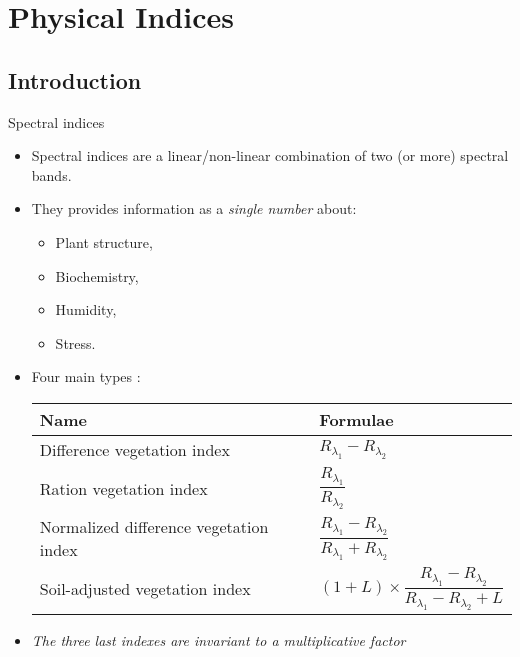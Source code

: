 \documentclass[10pt,aspectratio=1610]{beamer}
\begin{document}
\section{Physical Indices}
\label{sec:org38aefb3}
\subsection{Introduction}
\label{sec:orga617182}
\begin{frame}[label={sec:org0709c32}]{Spectral indices}
\begin{itemize}
\item Spectral indices are a linear/non-linear combination of two (or more) spectral bands.
\item They provides information as a \emph{single number} about:
\begin{itemize}
\item Plant structure,
\item Biochemistry,
\item Humidity,
\item Stress.
\end{itemize}
\item Four main types \cite{hrsv:2011}:
\begin{center}
\begin{tabular}{ll}
\toprule
Name & Formulae\\
\midrule
Difference vegetation index & \(R_{\lambda_1} - R_{\lambda_2}\)\\
Ration vegetation index & \(\dfrac{R_{\lambda_1}}{R_{\lambda_2}}\)\\
Normalized difference vegetation index & \(\dfrac{R_{\lambda_1} - R_{\lambda_2}}{R_{\lambda_1} + R_{\lambda_2}}\)\\
Soil-adjusted vegetation index & \((1+L)\times\dfrac{R_{\lambda_1} - R_{\lambda_2}}{R_{\lambda_1} - R_{\lambda_2}+L}\)\\
\bottomrule
\end{tabular}
\end{center}
\item \emph{The three last indexes are invariant to  a multiplicative factor}
\end{itemize}
\end{frame}
\end{document}
